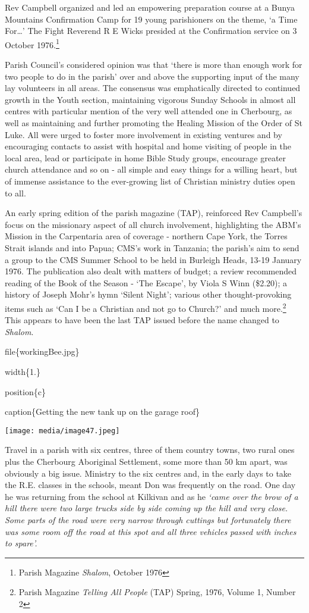 Rev Campbell organized and led an empowering preparation course at a Bunya Mountains Confirmation Camp for 19 young parishioners on the theme, `a Time For\ldots' The Fight Reverend R E Wicks presided at the Confirmation service on 3 October 1976.\footnote{Parish Magazine \emph{Shalom}, October 1976}

Parish Council's considered opinion was that `there is more than enough work for two people to do in the parish' over and above the supporting input of the many lay volunteers in all areas. The consensus was emphatically directed to continued growth in the Youth section, maintaining vigorous Sunday Schools in almost all centres with particular mention of the very well attended one in Cherbourg, as well as maintaining and further promoting the Healing Mission of the Order of St Luke. All were urged to foster more involvement in existing ventures and by encouraging contacts to assist with hospital and home visiting of people in the local area, lead or participate in home Bible Study groups, encourage greater church attendance and so on - all simple and easy things for a willing heart, but of immense assistance to the ever-growing list of Christian ministry duties open to all.

An early spring edition of the parish magazine (TAP), reinforced Rev Campbell's focus on the missionary aspect of all church involvement, highlighting the ABM's Mission in the Carpentaria area of coverage - northern Cape York, the Torres Strait islands and into Papua; CMS's work in Tanzania; the parish's aim to send a group to the CMS Summer School to be held in Burleigh Heads, 13-19 January 1976. The publication also dealt with matters of budget; a review recommended reading of the Book of the Season - `The Escape', by Viola S Winn (\$2.20); a history of Joseph Mohr's hymn `Silent Night'; various other thought-provoking items such as `Can I be a Christian and not go to Church?' and much more.\footnote{Parish Magazine \emph{Telling All People} (TAP) Spring, 1976, Volume 1, Number 2} This appears to have been the last TAP issued before the name changed to \emph{Shalom}.

file\{workingBee.jpg\}

width\{1.\}

position\{c\}

caption\{Getting the new tank up on the garage roof\}

\texttt{[image: media/image47.jpeg]}

Travel in a parish with six centres, three of them country towns, two rural ones plus the Cherbourg Aboriginal Settlement, some more than 50 km apart, was obviously a big issue. Ministry to the six centres and, in the early days to take the R.E. classes in the schools, meant Don was frequently on the road. One day he was returning from the school at Kilkivan and as he \emph{`came over the brow of a hill there were two large trucks side by side coming up the hill and very close. Some parts of the road were very narrow through cuttings but fortunately there was some room off the road at this spot and all three vehicles passed with inches to spare'.}

